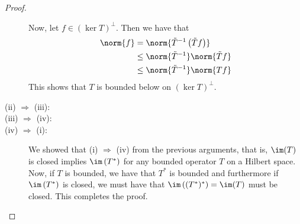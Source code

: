 \begin{proof}
\begin{description}
	    Now, let $f\in \left( \ker T \right)^{\perp}$. Then we have that 
	    \begin{align*}
		\norm{f} &= \norm{\tilde{T}^{-1}\left( \tilde{T} f \right)} \\
		&\le \norm{\tilde{T}^{-1}} \norm{\tilde{T}f} \\
		&\le \norm{\tilde{T}^{-1}} \norm{Tf}
	    \end{align*}
	    This shows that $T$ is bounded below on $\left( \ker T \right)^{\perp}$.
%
%
%
	    

		\item[(ii) $\Rightarrow$ (iii):]

	\item[(iii) $\Rightarrow$ (iv):]

	\item[(iv) $\Rightarrow$ (i):] We showed that (i) $\Rightarrow$ (iv) from the previous arguments, that is, $\im (T)$ is closed implies $\im \left( T^{*} \right)$ for any bounded operator $T$ on a Hilbert space. Now, if $T$ is bounded, we have that $T^{*}$ is bounded and furthermore if $\im \left( T^{*} \right)$ is closed, we must have that $\im \left( (T^{*})^{*} \right)=\im (T)$ must be closed. This completes the proof.
    \end{description}
\end{proof}
